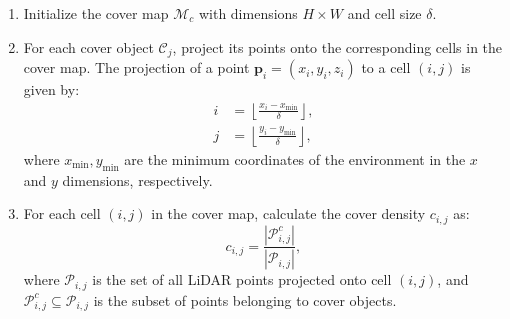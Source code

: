 \begin{enumerate}
    \item Initialize the cover map $\mathcal{M}_c$ with dimensions $H \times W$ and cell size $\delta$.
    \item For each cover object $\mathcal{C}_j$, project its points onto the corresponding cells in the cover map. The projection of a point $\mathbf{p}_i = (x_i, y_i, z_i)$ to a cell $(i, j)$ is given by:
    \begin{align}
    i &= \left\lfloor \frac{x_i - x_{\min}}{\delta} \right\rfloor, \\
    j &= \left\lfloor \frac{y_i - y_{\min}}{\delta} \right\rfloor,
    \end{align}
    where $x_{\min}, y_{\min}$ are the minimum coordinates of the environment in the $x$ and $y$ dimensions, respectively.
    \item For each cell $(i, j)$ in the cover map, calculate the cover density $c_{i,j}$ as:
    \begin{equation}
    c_{i,j} = \frac{|\mathcal{P}_{i,j}^c|}{|\mathcal{P}_{i,j}|},
    \end{equation}
    where $\mathcal{P}_{i,j}$ is the set of all LiDAR points projected onto cell $(i, j)$, and $\mathcal{P}_{i,j}^c \subseteq \mathcal{P}_{i,j}$ is the subset of points belonging to cover objects.
\end{enumerate}




